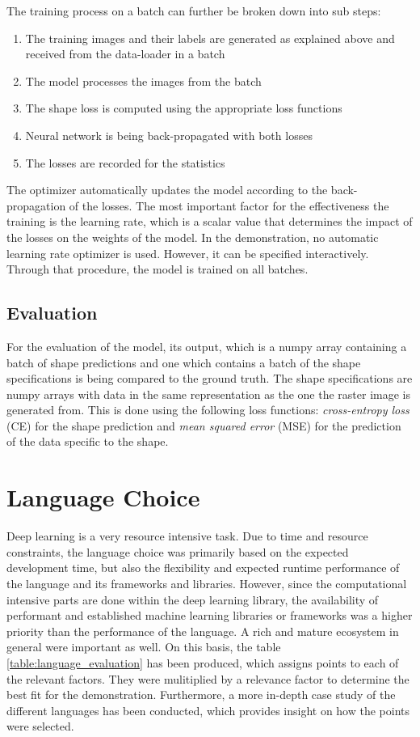 \documentclass[12pt, a4paper, titlepage]{report}
\begin{document}
The training process on a batch can further be broken down into sub steps:

\begin{enumerate}[label=\Roman*.]
   \item The training images and their labels are generated as explained above and received from the data-loader in a batch
   \item The model processes the images from the batch
   \item The shape loss is computed using the appropriate loss functions
   \item Neural network is being back-propagated with both losses
   \item The losses are recorded for the statistics
\end{enumerate}

The optimizer automatically updates the model according to the back-propagation of the losses. The most important factor for the effectiveness the training is the learning rate, which is a scalar value that determines the impact of the losses on the weights of the model. In the demonstration, no automatic learning rate optimizer is used. However, it can be specified interactively. Through that procedure, the model is trained on all batches.

\subsection{Evaluation}

For the evaluation of the model, its output, which is a numpy array containing a batch of shape predictions and one which contains a batch of the shape specifications is being compared to the ground truth. The shape specifications are numpy arrays with data in the same representation as the one the raster image is generated from.
This is done using the following loss functions: \emph{cross-entropy loss} (CE) for the shape prediction and \emph{mean squared error} (MSE) for the prediction of the data specific to the shape.


\section{Language Choice}  %

Deep learning is a very resource intensive task. Due to time and resource constraints, the language choice was primarily based on the expected development time, but also the flexibility and expected runtime performance of the language and its frameworks and libraries. However, since the computational intensive parts are done within the deep learning library, the availability of performant and established machine learning libraries or frameworks was a higher priority than the performance of the language. A rich and mature ecosystem in general were important as well. On this basis, the table \ref{table:language_evaluation} has been produced, which assigns points to each of the relevant factors. They were mulitiplied by a relevance factor to determine the best fit for the demonstration.
Furthermore, a more in-depth case study of the different languages has been conducted, which provides insight on how the points were selected.
\end{document}
